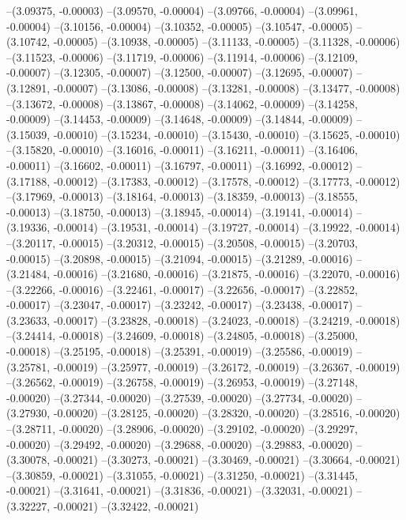 --(3.09375, -0.00003)
--(3.09570, -0.00004)
--(3.09766, -0.00004)
--(3.09961, -0.00004)
--(3.10156, -0.00004)
--(3.10352, -0.00005)
--(3.10547, -0.00005)
--(3.10742, -0.00005)
--(3.10938, -0.00005)
--(3.11133, -0.00005)
--(3.11328, -0.00006)
--(3.11523, -0.00006)
--(3.11719, -0.00006)
--(3.11914, -0.00006)
--(3.12109, -0.00007)
--(3.12305, -0.00007)
--(3.12500, -0.00007)
--(3.12695, -0.00007)
--(3.12891, -0.00007)
--(3.13086, -0.00008)
--(3.13281, -0.00008)
--(3.13477, -0.00008)
--(3.13672, -0.00008)
--(3.13867, -0.00008)
--(3.14062, -0.00009)
--(3.14258, -0.00009)
--(3.14453, -0.00009)
--(3.14648, -0.00009)
--(3.14844, -0.00009)
--(3.15039, -0.00010)
--(3.15234, -0.00010)
--(3.15430, -0.00010)
--(3.15625, -0.00010)
--(3.15820, -0.00010)
--(3.16016, -0.00011)
--(3.16211, -0.00011)
--(3.16406, -0.00011)
--(3.16602, -0.00011)
--(3.16797, -0.00011)
--(3.16992, -0.00012)
--(3.17188, -0.00012)
--(3.17383, -0.00012)
--(3.17578, -0.00012)
--(3.17773, -0.00012)
--(3.17969, -0.00013)
--(3.18164, -0.00013)
--(3.18359, -0.00013)
--(3.18555, -0.00013)
--(3.18750, -0.00013)
--(3.18945, -0.00014)
--(3.19141, -0.00014)
--(3.19336, -0.00014)
--(3.19531, -0.00014)
--(3.19727, -0.00014)
--(3.19922, -0.00014)
--(3.20117, -0.00015)
--(3.20312, -0.00015)
--(3.20508, -0.00015)
--(3.20703, -0.00015)
--(3.20898, -0.00015)
--(3.21094, -0.00015)
--(3.21289, -0.00016)
--(3.21484, -0.00016)
--(3.21680, -0.00016)
--(3.21875, -0.00016)
--(3.22070, -0.00016)
--(3.22266, -0.00016)
--(3.22461, -0.00017)
--(3.22656, -0.00017)
--(3.22852, -0.00017)
--(3.23047, -0.00017)
--(3.23242, -0.00017)
--(3.23438, -0.00017)
--(3.23633, -0.00017)
--(3.23828, -0.00018)
--(3.24023, -0.00018)
--(3.24219, -0.00018)
--(3.24414, -0.00018)
--(3.24609, -0.00018)
--(3.24805, -0.00018)
--(3.25000, -0.00018)
--(3.25195, -0.00018)
--(3.25391, -0.00019)
--(3.25586, -0.00019)
--(3.25781, -0.00019)
--(3.25977, -0.00019)
--(3.26172, -0.00019)
--(3.26367, -0.00019)
--(3.26562, -0.00019)
--(3.26758, -0.00019)
--(3.26953, -0.00019)
--(3.27148, -0.00020)
--(3.27344, -0.00020)
--(3.27539, -0.00020)
--(3.27734, -0.00020)
--(3.27930, -0.00020)
--(3.28125, -0.00020)
--(3.28320, -0.00020)
--(3.28516, -0.00020)
--(3.28711, -0.00020)
--(3.28906, -0.00020)
--(3.29102, -0.00020)
--(3.29297, -0.00020)
--(3.29492, -0.00020)
--(3.29688, -0.00020)
--(3.29883, -0.00020)
--(3.30078, -0.00021)
--(3.30273, -0.00021)
--(3.30469, -0.00021)
--(3.30664, -0.00021)
--(3.30859, -0.00021)
--(3.31055, -0.00021)
--(3.31250, -0.00021)
--(3.31445, -0.00021)
--(3.31641, -0.00021)
--(3.31836, -0.00021)
--(3.32031, -0.00021)
--(3.32227, -0.00021)
--(3.32422, -0.00021)
